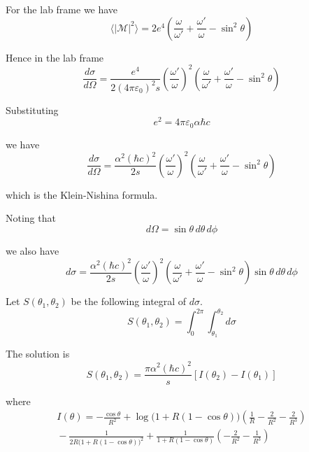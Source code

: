 For the lab frame we have
\begin{equation*}
\langle|\mathcal{M}|^2\rangle
=2e^4\left(
\frac{\omega}{\omega'}+\frac{\omega'}{\omega}-\sin^2\theta
\right)
\end{equation*}

Hence in the lab frame
\begin{equation*}
\frac{d\sigma}{d\Omega}
=\frac{e^4}{2(4\pi\varepsilon_0)^2s}
\left(\frac{\omega'}{\omega}\right)^2
\left(
\frac{\omega}{\omega'}+\frac{\omega'}{\omega}-\sin^2\theta
\right)
\end{equation*}

Substituting
\begin{equation*}
e^2=4\pi\varepsilon_0\alpha\hbar c
\end{equation*}

we have
\begin{equation*}
\frac{d\sigma}{d\Omega}
=\frac{\alpha^2(\hbar c)^2}{2s}
\left(\frac{\omega'}{\omega}\right)^2
\left(
\frac{\omega}{\omega'}+\frac{\omega'}{\omega}-\sin^2\theta
\right)
\end{equation*}

which is the Klein-Nishina formula.

\iffalse

Noting that
\begin{equation*}
d\Omega=\sin\theta\,d\theta\,d\phi
\end{equation*}

we also have
\begin{equation*}
d\sigma
=\frac{\alpha^2(\hbar c)^2}{2s}
\left(\frac{\omega'}{\omega}\right)^2
\left(
\frac{\omega}{\omega'}+\frac{\omega'}{\omega}-\sin^2\theta
\right)
\sin\theta\,d\theta\,d\phi
\end{equation*}

Let $S(\theta_1,\theta_2)$ be the following integral of $d\sigma$.
\begin{equation*}
S(\theta_1,\theta_2)=\int_0^{2\pi}\int_{\theta_1}^{\theta_2}d\sigma
\end{equation*}

The solution is
\begin{equation*}
S(\theta_1,\theta_2)=\frac{\pi\alpha^2(\hbar c)^2}{s}[I(\theta_2)-I(\theta_1)]
\end{equation*}

where
\begin{multline*}
I(\theta)=-\frac{\cos\theta}{R^2}
+\log\bigl(1+R(1-\cos\theta)\bigr)\left(\frac{1}{R}-\frac{2}{R^2}-\frac{2}{R^3}\right)
\\
{}-\frac{1}{2R\bigl(1+R(1-\cos\theta)\bigr)^2}
+\frac{1}{1+R(1-\cos\theta)}\left(-\frac{2}{R^2}-\frac{1}{R^3}\right)
\end{multline*}

